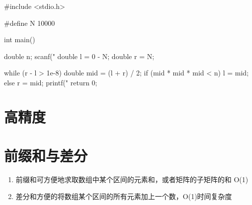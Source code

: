 \begin{mycpptwocol}[数的三次方根]
    #include <stdio.h>

    #define N 10000

    int main()
        {
        double n;
        scanf("%
        double l = 0 - N;
        double r = N;

        while (r - l > 1e-8) {
            double mid = (l + r) / 2;
            if (mid * mid * mid < n) {
                l = mid;
            } else {
                r = mid;
            }
        }
        printf("%
        return 0;
    }
\end{mycpptwocol}


\section{高精度}


\section{前缀和与差分}
\begin{enumerate}
    \item 前缀和可方便地求取数组中某个区间的元素和，或者矩阵的子矩阵的和 O(1)
    \item 差分和方便的将数组某个区间的所有元素加上一个数，O(1)时间复杂度
\end{enumerate}

